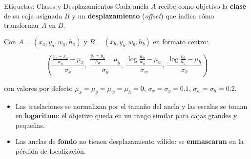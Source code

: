 \documentclass[aspectratio=169, 10pt]{beamer}
\newcommand{\formula}[1]{%
	\begin{tcolorbox}[colback=UCMBlue!8, colframe=UCMBlue, arc=4pt,
		boxsep=2pt, left=6pt, right=6pt, top=3pt, bottom=3pt]
		#1
	\end{tcolorbox}
}
\begin{document}
\begin{frame}{Etiquetas: Clases y Desplazamientos}
	Cada ancla $A$ recibe como objetivo la \textbf{clase} de su caja asignada $B$ y un \textbf{desplazamiento} (\textit{offset}) que indica cómo transformar $A$ en $B$.

	\vspace{0.2cm}
	Con $A=(x_a,y_a,w_a,h_a)$ y $B=(x_b,y_b,w_b,h_b)$ en formato centro:
	\formula{\[
		\left(
		\frac{\frac{x_b-x_a}{w_a}-\mu_x}{\sigma_x},\;
		\frac{\frac{y_b-y_a}{h_a}-\mu_y}{\sigma_y},\;
		\frac{\log\frac{w_b}{w_a}-\mu_w}{\sigma_w},\;
		\frac{\log\frac{h_b}{h_a}-\mu_h}{\sigma_h}
		\right)
		\]}
	con valores por defecto $\mu_x=\mu_y=\mu_w=\mu_h=0$, $\sigma_x=\sigma_y=0.1$, $\sigma_w=\sigma_h=0.2$.

	\begin{itemize}
		\item Las traslaciones se normalizan por el tamaño del ancla y las escalas se toman en \textbf{logaritmo}: el objetivo queda en un rango similar para cajas grandes y pequeñas.
		\item Las anclas de \textbf{fondo} no tienen desplazamiento válido: se \textbf{enmascaran} en la pérdida de localización.
	\end{itemize}
\end{frame}
\end{document}

